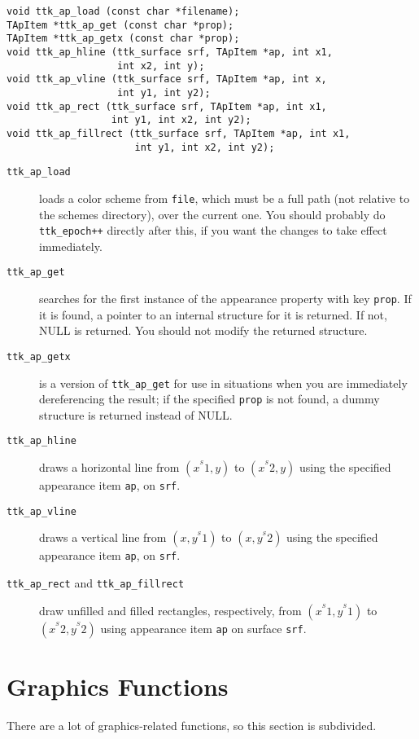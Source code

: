 \documentclass[12pt,letterpaper]{report}
\let\ttt\tt
\def\tt{\def\_{{\ttt\char`\_}}\ttt}
\begin{document}
\begin{verbatim}
void ttk_ap_load (const char *filename);
TApItem *ttk_ap_get (const char *prop);
TApItem *ttk_ap_getx (const char *prop);
void ttk_ap_hline (ttk_surface srf, TApItem *ap, int x1,
                   int x2, int y);
void ttk_ap_vline (ttk_surface srf, TApItem *ap, int x,
                   int y1, int y2);
void ttk_ap_rect (ttk_surface srf, TApItem *ap, int x1,
                  int y1, int x2, int y2);
void ttk_ap_fillrect (ttk_surface srf, TApItem *ap, int x1,
                      int y1, int x2, int y2);
\end{verbatim}
\vskip6pt
\begin{description}
\item[{\tt ttk_ap_load}] loads a color scheme from \verb|file|, which must be a full path (not
relative to the schemes directory), over the current one. You should probably do
\verb|ttk_epoch++| directly after this, if you want the changes to take effect immediately.
\item[{\tt ttk_ap_get}] searches for the first instance of the appearance property with key \verb|prop|.
If it is found, a pointer to an internal structure for it is returned. If not, NULL is returned. You should
not modify the returned structure.
\item[{\tt ttk_ap_getx}] is a version of \verb|ttk_ap_get| for use in situations when you are immediately
dereferencing the result; if the specified \verb|prop| is not found, a dummy structure is returned instead
of NULL.
\item[{\tt ttk_ap_hline}] draws a horizontal line from $(x^^S1,y)$ to $(x^^S2,y)$ using the specified
appearance item \verb|ap|, on \verb|srf|.
\item[{\tt ttk_ap_vline}] draws a vertical line from $(x,y^^S1)$ to $(x,y^^S2)$ using the specified
appearance item \verb|ap|, on \verb|srf|.
\item[{\tt ttk_ap_rect} and {\tt ttk_ap_fillrect}] draw unfilled and filled rectangles, respectively,
from $(x^^S1,y^^S1)$ to $(x^^S2,y^^S2)$ using appearance item \verb|ap| on surface \verb|srf|.
\end{description}

\section{Graphics Functions}
There are a lot of graphics-related functions, so this section is subdivided.
\end{document}
